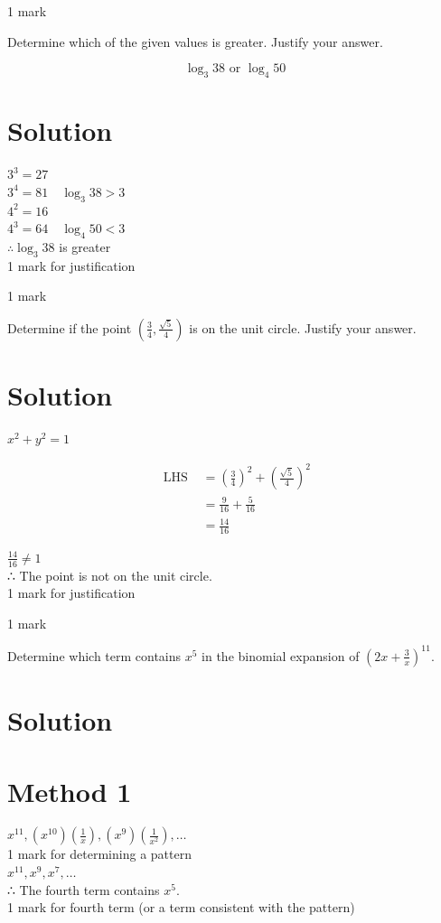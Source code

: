 \documentclass[10pt]{article}
\begin{document}
1 mark

Determine which of the given values is greater. Justify your answer.

$$
\log _{3} 38 \text { or } \log _{4} 50
$$

\section*{Solution}
$3^{3}=27$\\
$3^{4}=81 \quad \log _{3} 38>3$\\
$4^{2}=16$\\
$4^{3}=64 \quad \log _{4} 50<3$\\
$\therefore \log _{3} 38$ is greater\\
1 mark for justification

1 mark

Determine if the point $\left(\frac{3}{4}, \frac{\sqrt{5}}{4}\right)$ is on the unit circle. Justify your answer.

\section*{Solution}
$x^{2}+y^{2}=1$

$$
\begin{aligned}
\text { LHS } & =\left(\frac{3}{4}\right)^{2}+\left(\frac{\sqrt{5}}{4}\right)^{2} \\
& =\frac{9}{16}+\frac{5}{16} \\
& =\frac{14}{16}
\end{aligned}
$$

$\frac{14}{16} \neq 1$\\
∴ The point is not on the unit circle.\\
1 mark for justification

1 mark

Determine which term contains $x^{5}$ in the binomial expansion of $\left(2 x+\frac{3}{x}\right)^{11}$.

\section*{Solution}
\section*{Method 1}
$x^{11},\left(x^{10}\right)\left(\frac{1}{x}\right),\left(x^{9}\right)\left(\frac{1}{x^{2}}\right), \ldots$\\
1 mark for determining a pattern\\
$x^{11}, x^{9}, x^{7}, \ldots$\\
∴ The fourth term contains $x^{5}$.\\
1 mark for fourth term (or a term consistent with the pattern)
\end{document}
